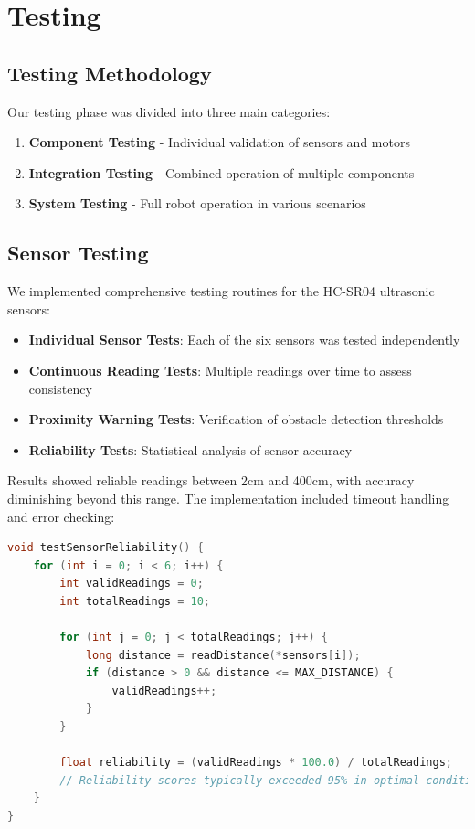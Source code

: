 \documentclass{article}
\begin{document}
\begin{minipage}[t]{0.5\textwidth}
\end{minipage}


\newpage
\section{Testing}
\subsection{Testing Methodology}
Our testing phase was divided into three main categories:

\begin{enumerate}
    \item \textbf{Component Testing} - Individual validation of sensors and motors
    \item \textbf{Integration Testing} - Combined operation of multiple components
    \item \textbf{System Testing} - Full robot operation in various scenarios
\end{enumerate}

\subsection{Sensor Testing}
We implemented comprehensive testing routines for the HC-SR04 ultrasonic sensors:

\begin{itemize}
    \item \textbf{Individual Sensor Tests}: Each of the six sensors was tested independently
    \item \textbf{Continuous Reading Tests}: Multiple readings over time to assess consistency
    \item \textbf{Proximity Warning Tests}: Verification of obstacle detection thresholds
    \item \textbf{Reliability Tests}: Statistical analysis of sensor accuracy
\end{itemize}

Results showed reliable readings between 2cm and 400cm, with accuracy diminishing beyond this range. The implementation included timeout handling and error checking:

\begin{lstlisting}[language=C, basicstyle=\ttfamily\footnotesize, frame=single]
void testSensorReliability() {
    for (int i = 0; i < 6; i++) {
        int validReadings = 0;
        int totalReadings = 10;

        for (int j = 0; j < totalReadings; j++) {
            long distance = readDistance(*sensors[i]);
            if (distance > 0 && distance <= MAX_DISTANCE) {
                validReadings++;
            }
        }

        float reliability = (validReadings * 100.0) / totalReadings;
        // Reliability scores typically exceeded 95% in optimal conditions
    }
}
\end{lstlisting}
\end{document}
